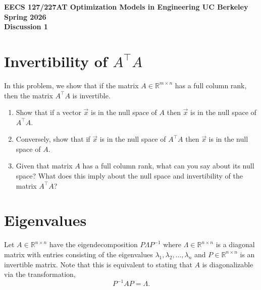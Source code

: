 \documentclass[10pt]{article}
\newcommand{\RR}{\mathbb{R}}
\begin{document}
\begin{center}
{\Large\bfseries EECS 127/227AT \quad Optimization Models in Engineering \quad UC Berkeley \quad Spring 2026}\\[6pt]
{\LARGE\bfseries Discussion 1}
\end{center}

\section{Invertibility of $A^\top A$}

In this problem, we show that if the matrix $A \in \RR^{m \times n}$ has a full column rank, then the matrix $A^\top A$ is invertible.

\begin{enumerate}[label=(\alph*)]
\item Show that if a vector $\vec{x}$ is in the null space of $A$ then $\vec{x}$ is in the null space of $A^\top A$.

\vspace{8cm}

\item Conversely, show that if $\vec{x}$ is in the null space of $A^\top A$ then $\vec{x}$ is in the null space of $A$.

\vspace{10cm}

\item Given that matrix $A$ has a full column rank, what can you say about its null space? What does this imply about the null space and invertibility of the matrix $A^\top A$?

\vspace{5cm}

\end{enumerate}

\newpage

\section{Eigenvalues}

Let $A \in \RR^{n \times n}$ have the eigendecomposition $P\Lambda P^{-1}$ where $\Lambda \in \RR^{n \times n}$ is a diagonal matrix with entries consisting of the eigenvalues $\lambda_1, \lambda_2, \ldots, \lambda_n$ and $P \in \RR^{n \times n}$ is an invertible matrix. Note that this is equivalent to stating that $A$ is diagonalizable via the transformation,
\begin{equation}
P^{-1}AP = \Lambda.
\end{equation}
\end{document}
